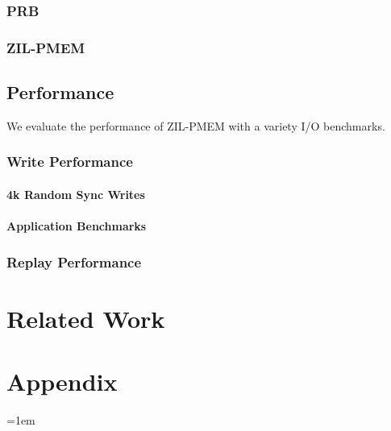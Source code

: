 \documentclass[12pt,a4paper,twoside]{book}
\begin{document}
\subsection{PRB}
\subsection{ZIL-PMEM}
\section{Performance}
We evaluate the performance of ZIL-PMEM with a variety I/O benchmarks.
\subsection{Write Performance}
\subsubsection{4k Random Sync Writes}
\subsubsection{Application Benchmarks}
\subsection{Replay Performance}

\chapter{Related Work}

\backmatter

\chapter{Appendix}\label{ch:appendix}

\cleardoublepage
{}
{}
\emergencystretch=1em
\printbibliography
\end{document}
